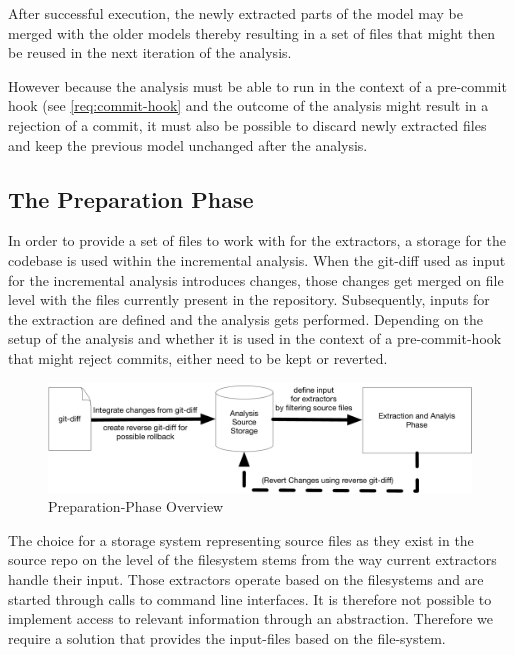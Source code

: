 \documentclass[a4paper]{article}
\begin{document}
After successful execution, the newly extracted parts of the model may be merged with the older models thereby resulting in a set of files that might then be reused in the next iteration of the analysis.

However because the analysis must be able to run in the context of a pre-commit hook (see \ref{req:commit-hook} and the outcome of the analysis might result in a rejection of a commit, it must also be possible to discard newly extracted files and keep the previous model unchanged after the analysis.

\subsection{The Preparation Phase}

In order to provide a set of files to work with for the extractors, a storage for the codebase is used within the incremental analysis. When the git-diff used as input for the incremental analysis introduces changes, those changes get merged on file level with the files currently present in the repository. Subsequently, inputs for the extraction are defined and the analysis gets performed. Depending on the setup of the analysis and whether it is used in the context of a pre-commit-hook that might reject commits, either need to be kept or reverted.

\begin{figure}[htbp] 
  \centering
  \begin{minipage}[b]{1\textwidth} 
    \caption[Preparation-Phase Overview]{Preparation-Phase Overview}\label{fig:preparation-overview}
    \includegraphics[width=1\textwidth]{img/PreparationOverview.pdf}
  \end{minipage}
\end{figure}

The choice for a storage system representing source files as they exist in the source repo on the level of the filesystem stems from the way current extractors handle their input. Those extractors operate based on the filesystems and are started through calls to command line interfaces. It is therefore not possible to implement access to relevant information through an abstraction. Therefore we require a solution that provides the input-files based on the file-system.
\end{document}
